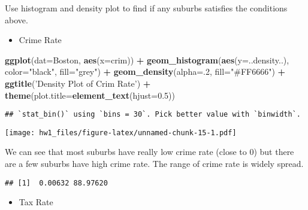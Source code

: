 \documentclass[]{article}
\newenvironment{Shaded}{\begin{snugshade}}{\end{snugshade}}
\newcommand{\DataTypeTok}[1]{\textcolor[rgb]{0.13,0.29,0.53}{#1}}
\newcommand{\DecValTok}[1]{\textcolor[rgb]{0.00,0.00,0.81}{#1}}
\newcommand{\FloatTok}[1]{\textcolor[rgb]{0.00,0.00,0.81}{#1}}
\newcommand{\KeywordTok}[1]{\textcolor[rgb]{0.13,0.29,0.53}{\textbf{#1}}}
\newcommand{\NormalTok}[1]{#1}
\newcommand{\OperatorTok}[1]{\textcolor[rgb]{0.81,0.36,0.00}{\textbf{#1}}}
\newcommand{\StringTok}[1]{\textcolor[rgb]{0.31,0.60,0.02}{#1}}
\providecommand{\tightlist}{%
  \setlength{\itemsep}{0pt}\setlength{\parskip}{0pt}}
\begin{document}
Use histogram and density plot to find if any suburbs satisfies the
conditions above.

\begin{itemize}
\tightlist
\item
  Crime Rate
\end{itemize}

\begin{Shaded}
\begin{Highlighting}[]
\KeywordTok{ggplot}\NormalTok{(}\DataTypeTok{dat=}\NormalTok{Boston, }\KeywordTok{aes}\NormalTok{(}\DataTypeTok{x=}\NormalTok{crim)) }\OperatorTok{+}\StringTok{ }\KeywordTok{geom_histogram}\NormalTok{(}\KeywordTok{aes}\NormalTok{(}\DataTypeTok{y=}\NormalTok{..density..), }\DataTypeTok{color=}\StringTok{"black"}\NormalTok{, }\DataTypeTok{fill=}\StringTok{"grey"}\NormalTok{) }\OperatorTok{+}\StringTok{ }\KeywordTok{geom_density}\NormalTok{(}\DataTypeTok{alpha=}\NormalTok{.}\DecValTok{2}\NormalTok{, }\DataTypeTok{fill=}\StringTok{"#FF6666"}\NormalTok{) }\OperatorTok{+}\StringTok{ }\KeywordTok{ggtitle}\NormalTok{(}\StringTok{'Density Plot of Crim Rate'}\NormalTok{) }\OperatorTok{+}\StringTok{ }\KeywordTok{theme}\NormalTok{(}\DataTypeTok{plot.title=}\KeywordTok{element_text}\NormalTok{(}\DataTypeTok{hjust=}\FloatTok{0.5}\NormalTok{))}
\end{Highlighting}
\end{Shaded}

\begin{verbatim}
## `stat_bin()` using `bins = 30`. Pick better value with `binwidth`.
\end{verbatim}

\texttt{[image: hw1\_files/figure-latex/unnamed-chunk-15-1.pdf]}

We can see that most suburbs have really low crime rate (close to 0) but
there are a few suburbs have high crime rate. The range of crime rate is
widely spread.

\begin{Shaded}
\end{Shaded}

\begin{verbatim}
## [1]  0.00632 88.97620
\end{verbatim}

\begin{itemize}
\tightlist
\item
  Tax Rate
\end{itemize}
\end{document}
